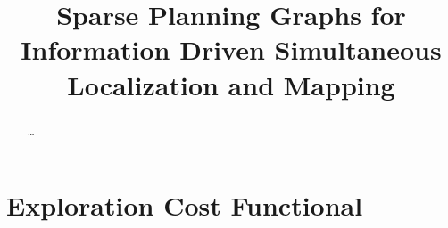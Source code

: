 \documentclass{article}
\begin{document}
\title{Sparse Planning Graphs for Information Driven Simultaneous Localization and Mapping}


\maketitle

\begin{abstract}
  \boldmath
  \dots
\end{abstract}



\section{Exploration Cost Functional}
\label{section:exploration_cost_functional}
\end{document}
